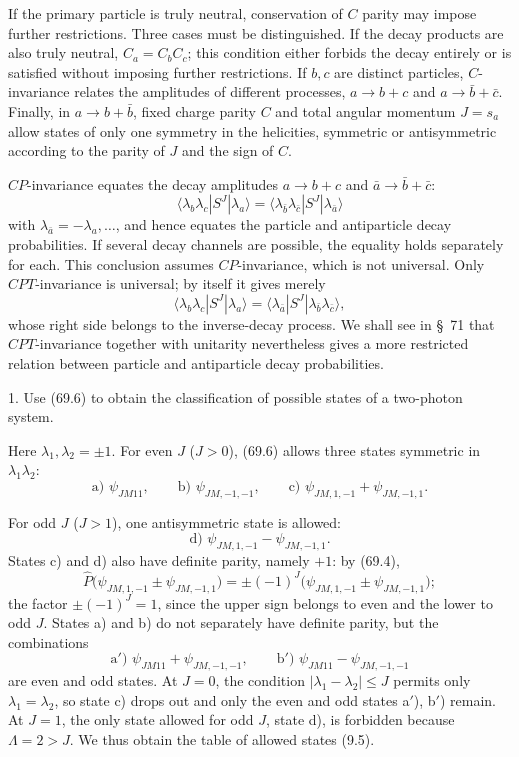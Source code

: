 If the primary particle is truly neutral, conservation of $C$ parity may impose further restrictions. Three cases must be distinguished. If the decay products are also truly neutral, $C_a=C_bC_c$; this condition either forbids the decay entirely or is satisfied without imposing further restrictions. If $b,c$ are distinct particles, $C$-invariance relates the amplitudes of different processes, $a\to b+c$ and $a\to\bar b+\bar c$. Finally, in $a\to b+\bar b$, fixed charge parity $C$ and total angular momentum $J=s_a$ allow states of only one symmetry in the helicities, symmetric or antisymmetric according to the parity of $J$ and the sign of $C$.

$CP$-invariance equates the decay amplitudes $a\to b+c$ and $\bar a\to\bar b+\bar c$:
\begin{equation}
\langle\lambda_b\lambda_c|S^J|\lambda_a\rangle
=\langle\lambda_{\bar b}\lambda_{\bar c}|S^J|\lambda_{\bar a}\rangle
\tag{69.14}
\end{equation}
with $\lambda_{\bar a}=-\lambda_a,\ldots$, and hence equates the particle and antiparticle decay probabilities. If several decay channels are possible, the equality holds separately for each. This conclusion assumes $CP$-invariance, which is not universal. Only $CPT$-invariance is universal; by itself it gives merely
\[
\langle\lambda_b\lambda_c|S^J|\lambda_a\rangle
=\langle\lambda_{\bar a}|S^J|\lambda_{\bar b}\lambda_{\bar c}\rangle,
\]
whose right side belongs to the inverse-decay process. We shall see in \S~71 that $CPT$-invariance together with unitarity nevertheless gives a more restricted relation between particle and antiparticle decay probabilities.

\ProblemHeading

1. Use (69.6) to obtain the classification of possible states of a two-photon system.

\SolutionHeading Here $\lambda_1,\lambda_2=\pm1$. For even $J$ ($J>0$), (69.6) allows three states symmetric in $\lambda_1\lambda_2$:
\[
\text{a) }\psi_{JM11},\qquad
\text{b) }\psi_{JM,-1,-1},\qquad
\text{c) }\psi_{JM,1,-1}+\psi_{JM,-1,1}.
\]

For odd $J$ ($J>1$), one antisymmetric state is allowed:
\[
\text{d) }\psi_{JM,1,-1}-\psi_{JM,-1,1}.
\]
States c) and d) also have definite parity, namely $+1$: by (69.4),
\[
\widehat P\bigl(\psi_{JM,1,-1}\pm\psi_{JM,-1,1}\bigr)
=\pm(-1)^J\bigl(\psi_{JM,1,-1}\pm\psi_{JM,-1,1}\bigr);
\]
the factor $\pm(-1)^J=1$, since the upper sign belongs to even and the lower to odd $J$. States a) and b) do not separately have definite parity, but the combinations
\[
\text{a$'$) }\psi_{JM11}+\psi_{JM,-1,-1},\qquad
\text{b$'$) }\psi_{JM11}-\psi_{JM,-1,-1}
\]
are even and odd states. At $J=0$, the condition $|\lambda_1-\lambda_2|\leqslant J$ permits only $\lambda_1=\lambda_2$, so state c) drops out and only the even and odd states a$'$), b$'$) remain. At $J=1$, the only state allowed for odd $J$, state d), is forbidden because $\Lambda=2>J$. We thus obtain the table of allowed states (9.5).

